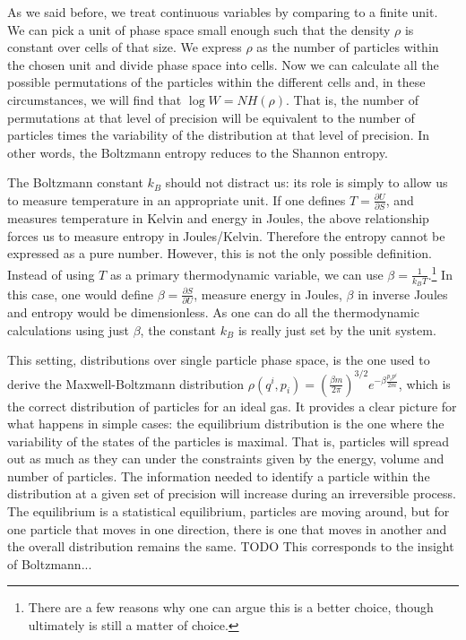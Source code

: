 \documentclass{article}
\begin{document}
As we said before, we treat continuous variables by comparing to a finite unit. We can pick a unit of phase space small enough such that the density $\rho$ is constant over cells of that size. We express $\rho$ as the number of particles within the chosen unit and divide phase space into cells. Now we can calculate all the possible permutations of the particles within the different cells and, in these circumstances, we will find that $\log W = N H(\rho)$. That is, the number of permutations at that level of precision will be equivalent to the number of particles times the variability of the distribution at that level of precision. In other words, the Boltzmann entropy reduces to the Shannon entropy.

The Boltzmann constant $k_B$ should not distract us: its role is simply to allow us to measure temperature in an appropriate unit. If one defines $T = \frac{\partial U}{\partial S}$, and measures temperature in Kelvin and energy in Joules, the above relationship forces us to measure entropy in Joules/Kelvin. Therefore the entropy cannot be expressed as a pure number. However, this is not the only possible definition. Instead of using $T$ as a primary thermodynamic variable, we can use $\beta = \frac{1}{k_B T}$.\footnote{There are a few reasons why one can argue this is a better choice, though ultimately is still a matter of choice.} In this case, one would define $\beta = \frac{\partial S}{\partial U}$, measure energy in Joules, $\beta$ in inverse Joules and entropy would be dimensionless. As one can do all the thermodynamic calculations using just $\beta$, the constant $k_B$ is really just set by the unit system.

This setting, distributions over single particle phase space, is the one used to derive the Maxwell-Boltzmann distribution $\rho(q^i, p_i) = \left(\frac{\beta m}{2\pi} \right)^{3/2}e^{-\beta \frac{p_ip^i}{2m}}$, which is the correct distribution of particles for an ideal gas. It provides a clear picture for what happens in simple cases: the equilibrium distribution is the one where the variability of the states of the particles is maximal. That is, particles will spread out as much as they can under the constraints given by the energy, volume and number of particles. The information needed to identify a particle within the distribution at a given set of precision will increase during an irreversible process. The equilibrium is a statistical equilibrium, particles are moving around, but for one particle that moves in one direction, there is one that moves in another and the overall distribution remains the same. TODO This corresponds to the insight of Boltzmann... 
\end{document}
